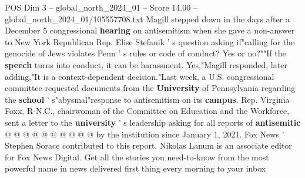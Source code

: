 \begin{textsample}{POS Dim 3 – global\_north\_2024\_01 – Score 14.00 – global\_north\_2024\_01/105557708.txt}
Magill stepped down in the days after a December 5 congressional \textbf{hearing} on antisemitism when she gave a non-answer to New York Republican Rep.
Elise Stefanik ' s question asking if"calling for the genocide of Jews violates Penn ' s rules or code of conduct?
Yes or no?""If the \textbf{speech} turns into conduct, it can be harassment.
Yes,"Magill responded, later adding,"It is a context-dependent decision."Last week, a U.S. congressional committee requested documents from the \textbf{University} of Pennsylvania regarding the \textbf{school} ' s"abysmal"response to antisemitism on its \textbf{campus}.
Rep.
Virginia Foxx, R-N.C., chairwoman of the Committee on Education and the Workforce, sent a letter to the \textbf{university} ' s leadership asking for all reports of \textbf{antisemitic} @ @ @ @ @ @ @ @ @ @ by the institution since January 1, 2021.
Fox News ' Stephen Sorace contributed to this report.
Nikolas Lanum is an associate editor for Fox News Digital.
Get all the stories you need-to-know from the most powerful name in news delivered first thing every morning to your inbox

\end{textsample}
